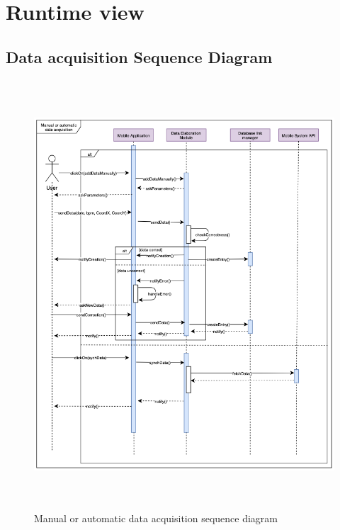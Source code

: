 \documentclass[DD.tex]{subfiles}
\begin{document}
\section{Runtime view}
\subsection{Data acquisition Sequence Diagram}
\begin{figure}[h!]
\centering
\includegraphics[height=16.00cm,keepaspectratio]{Figures/DataAcquisition}
\caption{Manual or automatic data acquisition sequence diagram}
\end{figure}
\end{document}
